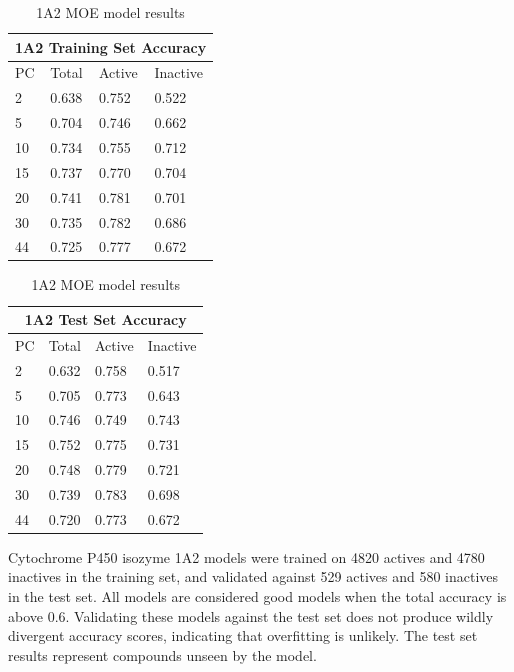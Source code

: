 \begin{table}[!h]
\begin{minipage}{.5\linewidth}
\centering
\begin{tabular}{|l|l|l|l|}
\hline
\multicolumn{4}{|c|}{1A2 Training Set Accuracy}   \\ \hline
PC & Total          & Active          & Inactive  \\ \hline
2  & 0.638          & 0.752           & 0.522     \\ \hline
5  & 0.704          & 0.746           & 0.662     \\ \hline
10 & 0.734          & 0.755           & 0.712     \\ \hline
15 & 0.737          & 0.770           & 0.704     \\ \hline
20 & 0.741          & 0.781           & 0.701     \\ \hline
30 & 0.735          & 0.782           & 0.686     \\ \hline
44 & 0.725          & 0.777           & 0.672     \\ \hline
\end{tabular}
\end{minipage}
\begin{minipage}{.5\linewidth}
\centering
\begin{tabular}{|l|l|l|l|}
\hline
\multicolumn{4}{|c|}{1A2 Test Set Accuracy}     \\ \hline
PC & Total          & Active          & Inactive \\ \hline
2  & 0.632          & 0.758           & 0.517   \\ \hline
5  & 0.705          & 0.773           & 0.643   \\ \hline
10 & 0.746          & 0.749           & 0.743   \\ \hline
15 & 0.752          & 0.775           & 0.731   \\ \hline
20 & 0.748          & 0.779           & 0.721   \\ \hline
30 & 0.739          & 0.783           & 0.698   \\ \hline
44 & 0.720          & 0.773           & 0.672   \\ \hline
\end{tabular}
\end{minipage}
\caption{1A2 MOE model results}
\end{table}

Cytochrome P450 isozyme 1A2 models were trained on 4820 actives and 4780 inactives in the training set, and validated against 529 actives and 580 inactives in the test set. All models are considered good models when the total accuracy is above 0.6. Validating these models against the test set does not produce wildly divergent accuracy scores, indicating that overfitting is unlikely. The test set results represent compounds unseen by the model. 

